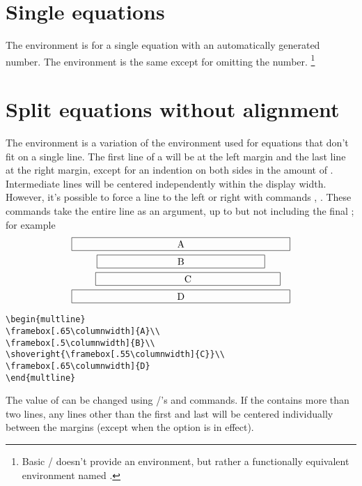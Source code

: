 \documentclass[leqno,titlepage,openany]{amsldoc}
\begin{document}
\section{Single equations}

The  environment is for a single equation with an
automatically generated number. The  environment is the
same except for omitting the number.%
\footnote{Basic \latex/ doesn't provide an  environment,
but rather a functionally equivalent environment named
.}

\section{Split equations without alignment}

The  environment is a variation of the 
environment used for equations that don't fit on a single line. The
first line of a  will be at the left margin and the last
line at the right margin, except for an indention on both sides in the
amount of . Intermediate lines will be centered
independently within the display width. However, it's possible to force
a line to the left or right with commands ,
. These commands take the entire line as an argument, up
to but not including the final \cn{\\}; for example
\begin{multline}
\framebox[.65\columnwidth]{A}\\
\framebox[.5\columnwidth]{B}\\
\shoveright{\framebox[.55\columnwidth]{C}}\\
\framebox[.65\columnwidth]{D}
\end{multline}
\begin{verbatim}
\begin{multline}
\framebox[.65\columnwidth]{A}\\
\framebox[.5\columnwidth]{B}\\
\shoveright{\framebox[.55\columnwidth]{C}}\\
\framebox[.65\columnwidth]{D}
\end{multline}
\end{verbatim}

The value of  can be changed using \latex/'s
 and  commands. If the 
contains more than two lines, any lines other than the first and last
will be centered individually between the margins (except when the
 option is in effect).
\end{document}
